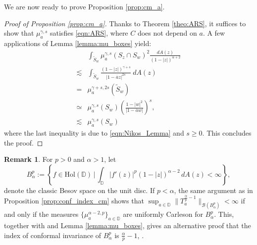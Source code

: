 \documentclass[12pt]{amsart}
\theoremstyle{definition}
\newtheorem{remark}[theorem]{Remark}
\newcommand{\D}{\mathbb{{D}}}
\newcommand{\Hol}{\mathrm{Hol}(\D)}
\numberwithin{equation}{section}
\begin{document}
        We are now ready to prove Proposition \ref{prop:cm_a}.
        
        \begin{proof}[Proof of Proposition \ref{prop:cm_a}]
            Thanks to Theorem \ref{theo:ARS}, it suffices to show that $\mu^{\gamma, s}_a$ satisfies \eqref{eqn:ARS}, where $C$ does not depend on $a$. A few applications of Lemma \ref{lemma:mu_boxes} yield:
                \[
                    \begin{split}
                        &\int_{\tilde S_w}\mu_a^{\gamma, s}(S_z\cap S_w)^2\frac{dA(z)}{(1-|z|)^{\alpha+2}}\\
                        \lesssim&\int_{\tilde S_w}\frac{(1-|z|)^{\gamma+s}}{|1-\overline az|^{2s}}~dA(z)\\
                        =&\mu_a^{\gamma+s, 2s}(\tilde{S}_w)\\
                        \simeq& \mu_a^{\gamma, s}(S_w)\left(\frac{1-|w|^2}{|1-\overline aw|}\right)^s,\\
                        \lesssim & \mu_a^{\gamma, s}(S_w)
                    \end{split}
                \]
            where the last inequality is due to \eqref{eqn:Nikos_Lemma} and $s\ge0$. This concludes the proof.
        \end{proof}

        \begin{remark}
        \label{rem:AM}
            For $p > 0$ and $\alpha > 1$, let 
                \[
                    B^p_\alpha:=\left\{f\in \Hol \,\bigg|\, \int_\D |f'(z)|^p(1-|z|)^{\alpha-2}\,dA(z) < \infty \right\},
                \]
                denote the classic Besov space on the unit disc. If $p < \alpha$, the same argument as in Proposition \ref{prop:conf_index_cm} shows that  $\sup_{a\in\D}\big\|T^{\frac{\alpha}{p}-1}_a\big\|_{\mathcal{B}(B^p_\alpha)}<\infty$ if and only if the measures $\{\mu^{\alpha-2, p}_a\}_{a\in\D}$ are uniformly Carleson for $B^p_\alpha$. This, together with \cite[Thm. 1]{ARS02} and Lemma \ref{lemma:mu_boxes}, gives an alternative proof that the index of conformal invariance of $B^p_\alpha$ is $\frac{\alpha}{p}-1$, \cite{AM21}.
        \end{remark}



        
\end{document}
